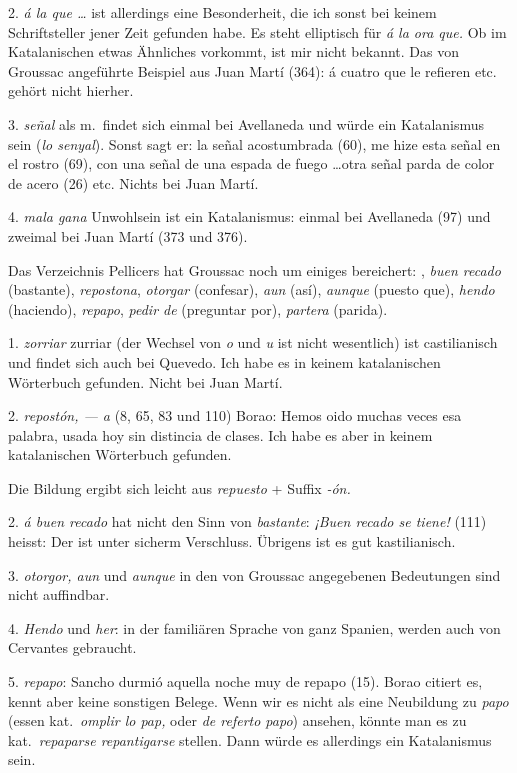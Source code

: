 2. {\it á la que \dots} ist allerdings eine Besonderheit, die ich sonst bei
keinem Schriftsteller jener Zeit gefunden habe. Es steht elliptisch für
{\it á la ora que.} Ob im Katalanischen etwas Ähnliches vorkommt, ist mir
nicht bekannt. Das von Groussac angeführte Beispiel aus Juan Martí
(364): {\itquoted\spanish á cuatro que le refieren} etc. gehört nicht hierher.

3. {\it señal} als m.\ findet sich einmal bei Avellaneda und würde ein
Katalanismus sein ({\it lo senyal\/}). Sonst sagt er:
{\itquoted\spanish la señal acostumbrada}
(60), {\itquoted\spanish me hize esta señal en el rostro} (69),
{\itquoted con una señal de una
espada de fuego \dots otra señal parda de color de acero} (26) etc.
Nichts bei Juan Martí.

4. {\it mala gana} \longeq Unwohlsein ist ein Katalanismus: einmal bei
Avellaneda (97) und zweimal bei Juan Martí (373 und 376).

Das Verzeichnis Pellicers hat Groussac noch um einiges bereichert:
{, {\it buen recado} (bastante), {\it repostona}, {\it otorgar}
(confesar), {\it aun} (así),
{\it aunque} (puesto que), {\it hendo} (haciendo), {\it repapo}, {\it pedir de}
(preguntar por), {\it partera} (parida).}

1. {\it zorriar} \longeq zurriar (der Wechsel von {\it o} und {\it u} ist nicht wesentlich)
ist castilianisch und findet sich auch bei Quevedo. Ich habe es in
keinem katalanischen Wörterbuch gefunden. Nicht bei Juan Martí.

2. {\it repostón, --- a} (8, 65, 83 und 110) Borao:
{\itquoted Hemos oido muchas veces esa palabra, usada hoy sin distincia de clases.}
Ich habe es aber in keinem katalanischen Wörterbuch gefunden.

Die Bildung ergibt sich leicht aus {\it repuesto} + Suffix {\it -ón.}

2. {\it á buen recado} hat nicht den Sinn von {\it bastante\/}: {\it ¡Buen recado
se tiene!} (111) heisst: Der ist unter sicherm Verschluss. Übrigens
ist es gut kastilianisch.

3. {\it otorgor, aun} und {\it aunque} in den von Groussac angegebenen
Bedeutungen sind nicht auffindbar.

4. {\it Hendo} und {\it her\/}: in der familiären Sprache von ganz Spanien,
werden auch von Cervantes gebraucht.

5. {\it repapo\/}: {\itquoted Sancho durmió aquella noche muy de repapo} (15).
Borao citiert es, kennt aber keine sonstigen Belege. Wenn wir es nicht
als eine Neubildung zu {\it papo} (essen  kat.~{\it omplir lo
pap,} oder {\it de referto papo\/}) ansehen, könnte man es zu kat.~{\it repaparse \longeq
repantigarse} stellen. Dann würde es allerdings ein Katalanismus sein.

